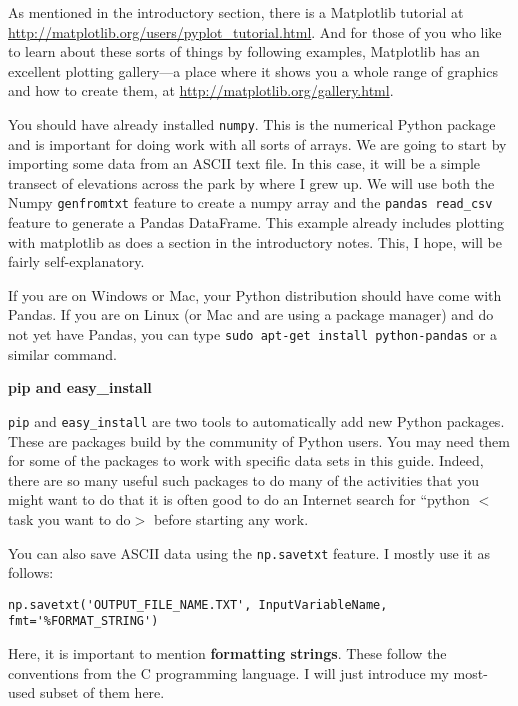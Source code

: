 \documentclass[a4paper,10pt]{scrartcl}
\begin{document}
\begin{framed}
As mentioned in the introductory section, there is a Matplotlib tutorial at \url{http://matplotlib.org/users/pyplot_tutorial.html}. And for those of you who like to learn about these sorts of things by following examples, Matplotlib has an excellent plotting gallery---a place where it shows you a whole range of graphics and how to create them, at \url{http://matplotlib.org/gallery.html}.
\end{framed}

You should have already installed \lstinline{numpy}. This is the numerical Python package and is important for doing work with all sorts of arrays. We are going to start by importing some data from an ASCII text file. In this case, it will be a simple transect of elevations across the park by where I grew up. We will use both the Numpy \lstinline{genfromtxt} feature to create a numpy array and the \lstinline{pandas read_csv} feature to generate a Pandas DataFrame. This example already includes plotting with matplotlib as does a section in the introductory notes. This, I hope, will be fairly self-explanatory.

If you are on Windows or Mac, your Python distribution should have come with Pandas. If you are on Linux (or Mac and are using a package manager) and do not yet have Pandas, you can type \lstinline{sudo apt-get install python-pandas} or a similar command.

\begin{framed}
\textbf{pip and easy\_install}

\lstinline{pip} and \lstinline{easy_install} are two tools to automatically add new Python packages. These are packages build by the community of Python users. You may need them for some of the packages to work with specific data sets in this guide. Indeed, there are so many useful such packages to do many of the activities that you might want to do that it is often good to do an Internet search for ``python $<$task you want to do$>$ before starting any work.
\end{framed}



You can also save ASCII data using the \lstinline{np.savetxt} feature. I mostly use it as follows:
\begin{lstlisting}
np.savetxt('OUTPUT_FILE_NAME.TXT', InputVariableName, fmt='%FORMAT_STRING')
\end{lstlisting}

Here, it is important to mention \textbf{formatting strings}. These follow the conventions from the C programming language. I will just introduce my most-used subset of them here.
\end{document}
